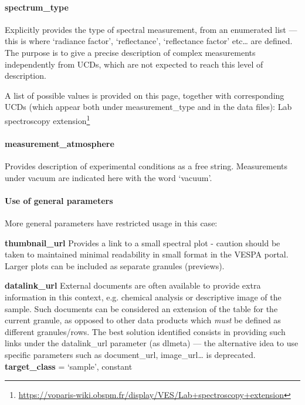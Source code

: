 \documentclass[11pt,a4paper]{ivoa}
\begin{document}
\paragraph{spectrum\_type}

Explicitly provides the type of spectral measurement, from an enumerated
list --- this is where `radiance factor', `reflectance', `reflectance
factor' etc… are defined. The purpose is to give a precise description
of complex measurements independently from UCDs, which are not expected
to reach this level of description.

A list of possible values is provided on this page,
together with corresponding UCDs (which appear both under
measurement\_type and in the data files): Lab spectroscopy
extension\footnote{\url{https://voparis-wiki.obspm.fr/display/VES/Lab+spectroscopy+extension}}

\paragraph{measurement\_atmosphere}

Provides description of experimental conditions as a free string.
Measurements under vacuum are indicated here with the word `vacuum'.

\paragraph{Use of general parameters}

More general parameters have restricted usage in this case:

\textbf{thumbnail\_url }Provides a link to a small spectral plot -
caution should be taken to maintained minimal readability in small format
in the VESPA portal. Larger plots can be included as separate granules
(previews).

\textbf{datalink\_url} External documents are often available to provide
extra information in this context, e.g. chemical analysis or descriptive
image of the sample. Such documents can be considered an extension of the
table for the current granule, as opposed to other data products which
\emph{must} be defined as different granules/rows. The best solution
identified consists in providing such links under the datalink\_url
parameter (as dlmeta)  --- the alternative idea to use specific parameters
such as document\_url, image\_url… is deprecated.\\

\textbf{target\_class }= `sample', constant
\end{document}
